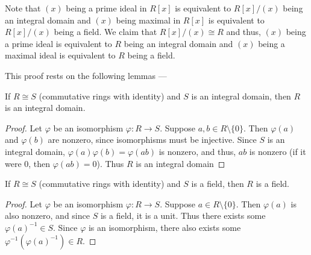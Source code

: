 \documentclass[12 pt, letterpaper]{hmcpset}
\begin{document}
\begin{solution}
	Note that $(x)$ being a prime ideal in $R[x]$ is equivalent to $R[x]/(x)$ being an integral domain and $(x)$ being maximal in $R[x]$ is equivalent to $R[x]/(x)$ being a field. We claim that $R[x]/(x) \cong R$ and thus, $(x)$ being a prime ideal is equivalent to $R$ being an integral domain and $(x)$ being a maximal ideal is equivalent to $R$ being a field. 

	
	This proof rests on the following lemmas ---
	\begin{lemma}
		If $R \cong S$ (commutative rings with identity) and $S$ is an integral domain, then $R$ is an integral domain.
	\end{lemma}
	\begin{proof}
		Let $\varphi$ be an isomorphism $\varphi : R \to S$. Suppose $a, b \in R \setminus \{ 0 \}$. Then $\varphi(a)$ and $\varphi(b)$ are nonzero, since isomorphisms must be injective. Since $S$ is an integral domain, $\varphi(a)\varphi(b) = \varphi(ab)$ is nonzero, and thus, $ab$ is nonzero (if it were $0$, then $\varphi(ab) = 0$). Thus $R$ is an integral domain
	\end{proof}
	\begin{lemma}
		If $R \cong S$ (commutative rings with identity) and $S$ is a field, then $R$ is a field.
	\end{lemma}
	\begin{proof}
		Let $\varphi$ be an isomorphism $\varphi : R \to S$. Suppose $a \in R \setminus \{ 0 \}$. Then $\varphi(a)$ is also nonzero, and since $S$ is a field, it is a unit. Thus there exists some $\varphi(a)^{-1} \in S$. Since $\varphi$ is an isomorphism, there also exists some $\varphi^{-1}(\varphi(a)^{-1}) \in R$. 


\end{proof}
\end{solution}
\end{document}
